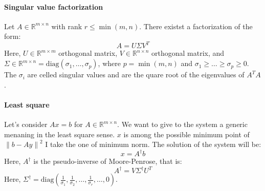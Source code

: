 \paragraph*{Singular value factorization}
Let $A \in \mathbb{R}^{m \times n}$ with rank $r \leq \min(m,n)$. 
There existst a factorization of the form: 
\[A=U\Sigma V^T\]
Here, $U \in \mathbb{R}^{m \times m}$ orthogonal matrix, $V \in \mathbb{R}^{n \times n}$ orthogonal matrix, and $\Sigma \in \mathbb{R}^{m \times n}=\text{diag}(\sigma_1,\dots,\sigma_p)$, where $p=\min(m,n)$ and $\sigma_1 \geq \dots \geq \sigma_p \geq 0$. 
The $\sigma_i$ are celled singular values and are the quare root of the eigenvalues of $A^TA$. 

\paragraph*{Least square}
Let's consider $Ax=b$ for $A \in \mathbb{R}^{m \times n}$. 
We want to give to the system a generic menaning in the least square sense. 
$x$ is among the possible minimum point of $\left\lVert b-Ay \right\rVert^2 $ I take the one of minimum norm. 
The solution of the system will be: 
\[x=A^{\dagger}b\]
Here, $A^{\dagger}$ is the pseudo-inverse of Moore-Penrose, that is: 
\[A^{\dagger}=V \Sigma^{\dagger}U^T\]
Here, $\Sigma^{\dagger}=\text{diag}\left(\frac{1}{\sigma_1},\frac{1}{\sigma_2},\dots,\frac{1}{\sigma_r},\dots,0\right)$. 